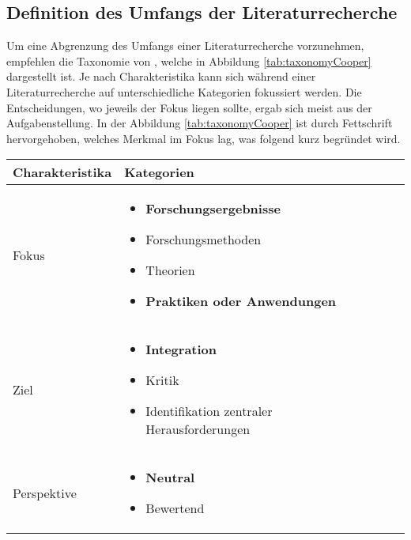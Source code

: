 \subsection{Definition des Umfangs der Literaturrecherche}
Um eine Abgrenzung des Umfangs einer Literaturrecherche vorzunehmen, empfehlen \cite{vom_Brooke_2009} die Taxonomie von \cite{cooper_organizing_1988}, welche in Abbildung \ref{tab:taxonomyCooper} dargestellt ist. Je nach Charakteristika kann sich während einer Literaturrecherche auf unterschiedliche Kategorien fokussiert werden. Die Entscheidungen, wo jeweils der Fokus liegen sollte, ergab sich meist aus der Aufgabenstellung. In der Abbildung \ref{tab:taxonomyCooper} ist durch Fettschrift hervorgehoben, welches Merkmal im Fokus lag, was folgend kurz begründet wird.

\begin{table}[h]
\begin{tabular}[h]{p{3.5cm}|p{8cm} l|l}
\large\textbf{Charakteristika} & \large\textbf{Kategorien} \\
\hline
Fokus & \begin{itemize}[nosep, leftmargin=*, before=\vspace{-0.5\baselineskip},after =\vspace{-\baselineskip}]
\item \textbf{Forschungsergebnisse}
\item Forschungsmethoden
\item Theorien
\item \textbf{Praktiken oder Anwendungen}
\end{itemize} \\
\hline
Ziel & \begin{itemize}[nosep, leftmargin=*, before=\vspace{-0.5\baselineskip},after =\vspace{-\baselineskip}]
\item \textbf{Integration}
\item Kritik
\item Identifikation zentraler Herausforderungen
\end{itemize} \\
\hline
Perspektive & \begin{itemize}[nosep, leftmargin=*, before=\vspace{-0.5\baselineskip},after =\vspace{-\baselineskip}]
\item \textbf{Neutral}
\item Bewertend
\end{itemize} \\

\end{tabular}
\end{table}
